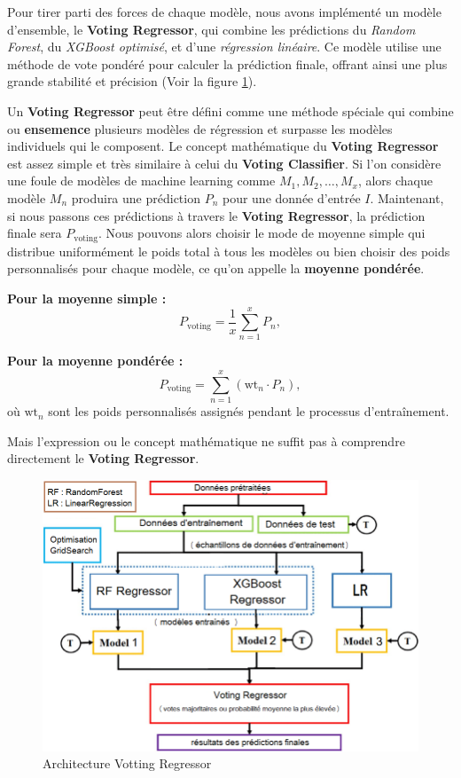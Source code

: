 Pour tirer parti des forces de chaque modèle, nous avons implémenté un modèle d'ensemble, le \textbf{Voting Regressor}, qui combine les prédictions du \textit{Random Forest}, du \textit{XGBoost optimisé}, et d'une \textit{régression linéaire}. Ce modèle utilise une méthode de vote pondéré pour calculer la prédiction finale, offrant ainsi une plus grande stabilité et précision (Voir la figure \ref{fig:schemaensemble}).

Un \textbf{Voting Regressor} peut être défini comme une méthode spéciale qui combine ou \textbf{ensemence} plusieurs modèles de régression et surpasse les modèles individuels qui le composent. Le concept mathématique du \textbf{Voting Regressor} est assez simple et très similaire à celui du \textbf{Voting Classifier}. Si l'on considère une foule de modèles de machine learning comme \(M_1, M_2,\dots , M_x\), alors chaque modèle \(M_n\) produira une prédiction \(P_n\) pour une donnée d'entrée \(I\). Maintenant, si nous passons ces prédictions à travers le \textbf{Voting Regressor}, la prédiction finale sera \(P_{\text{voting}}\). Nous pouvons alors choisir le mode de moyenne simple qui distribue uniformément le poids total à tous les modèles ou bien choisir des poids personnalisés pour chaque modèle, ce qu'on appelle la \textbf{moyenne pondérée}.

\textbf{Pour la moyenne simple :} 
\[
P_{\text{voting}}=\frac{1}{x}\sum_{n=1}^x{P_n}  ,     
\]

\textbf{Pour la moyenne pondérée :} 
\[
P_{\text{voting}}=\sum_{n=1}^x (\text{wt}_{n} \cdot P_n) ,
\]
où \(\text{wt}_n\) sont les poids personnalisés assignés pendant le processus d'entraînement.

Mais l'expression ou le concept mathématique ne suffit pas à comprendre directement le \textbf{Voting Regressor}.


\begin{figure}[h!]
	\centering
	\includegraphics[width=0.9\linewidth]{images/Architecture}
	\caption{Architecture Votting Regressor}
	\label{fig:schemaensemble}
\end{figure}
